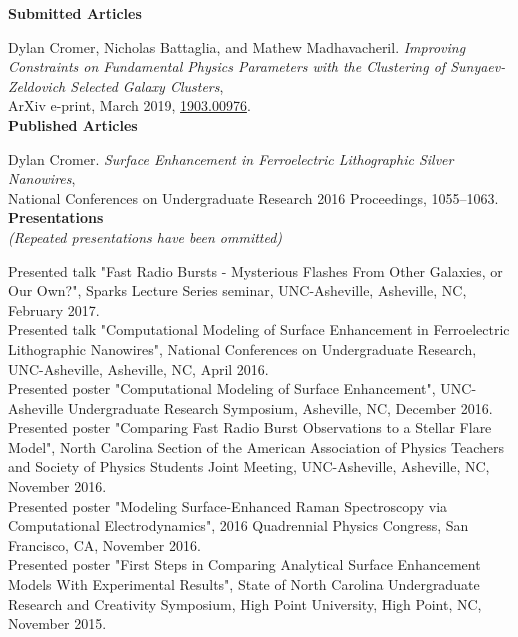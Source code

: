 \documentclass[letterpaper, 11pt]{article}
\newcommand{\noi}{\noindent}
\newcommand{\ind}{\indent}
\begin{document}
\noi \textbf{Submitted Articles}

\noi Dylan Cromer, Nicholas Battaglia, and Mathew Madhavacheril. \emph{Improving Constraints on Fundamental Physics Parameters with the Clustering of Sunyaev-Zeldovich Selected Galaxy Clusters},
\\
\ind ArXiv e-print, March 2019, \href{https://arxiv.org/abs/1903.00976}{1903.00976}.
\\

\noi \textbf{Published Articles}

\noi Dylan Cromer. \emph{Surface Enhancement in Ferroelectric Lithographic Silver Nanowires}, 
\\
	\ind National Conferences on Undergraduate Research 2016 Proceedings, 1055--1063.
\\

\noi \textbf{Presentations}
\\
\emph{(Repeated presentations have been ommitted)}

\noi Presented talk "Fast Radio Bursts - Mysterious Flashes From Other Galaxies, or Our Own?", Sparks Lecture Series seminar, UNC-Asheville, Asheville, NC, February 2017.
\\

\noi Presented talk "Computational Modeling of Surface Enhancement in Ferroelectric Lithographic Nanowires", National Conferences on Undergraduate Research, UNC-Asheville, Asheville, NC, April 2016.
\\

\noi Presented poster "Computational Modeling of Surface Enhancement", UNC-Asheville Undergraduate Research Symposium, Asheville, NC, December 2016.
\\

\noi Presented poster "Comparing Fast Radio Burst Observations to a Stellar Flare Model", North Carolina Section of the American Association of Physics Teachers and Society of Physics Students Joint Meeting, UNC-Asheville, Asheville, NC, November 2016.
\\

\noi Presented poster "Modeling Surface-Enhanced Raman Spectroscopy via Computational Electrodynamics", 2016 Quadrennial Physics Congress, San Francisco, CA, November 2016.
\\

\noi Presented poster "First Steps in Comparing Analytical Surface Enhancement Models With Experimental Results", State of North Carolina Undergraduate Research and Creativity Symposium, High Point University, High Point, NC, November 2015.
\\
\end{document}
